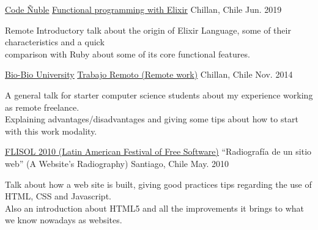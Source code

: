 

\begin{cventries}

  \cventry
    {\href{https://codenuble.cl/}{\underline{Code Ñuble}}} %
    {\href{https://alagos.github.io/elixir-talk}{\underline{Functional programming with Elixir}}} %
    {Chillan, Chile} %
    {Jun. 2019} %
    {
      \begin{cvitems} %
        \item {
          Remote Introductory talk about the origin of Elixir Language, some of their characteristics and a quick \\
          comparison with Ruby about some of its core functional features.
        }
      \end{cvitems}
    }

  \cventry
    {\href{http://www.ubiobio.cl/}{\underline{Bio-Bio University}}} %
    {\href{https://alagos.github.io/trabajo-remoto}{\underline{Trabajo Remoto (Remote work)}}} %
    {Chillan, Chile} %
    {Nov. 2014} %
    {
      \begin{cvitems} %
        \item {
          A general talk for starter computer science students about my experience working as remote freelance.\\
          Explaining advantages/disadvantages and giving some tips about how to start with this work modality.
        }
      \end{cvitems}
    }

  \cventry
    {\href{http://santiago.flisol.cl/}{\underline{FLISOL 2010 (Latin American Festival of Free Software)}}} %
    {“Radiografía de un sitio web” (A Website's Radiography)} %
    {Santiago, Chile} %
    {May. 2010} %
    {
      \begin{cvitems} %
        \item {
          Talk about how a web site is built, giving good practices tips regarding the use of HTML, CSS and Javascript.\\
          Also an introduction about HTML5 and all the improvements it brings to what we know nowadays as websites.
        }
      \end{cvitems}
    }

\end{cventries}
